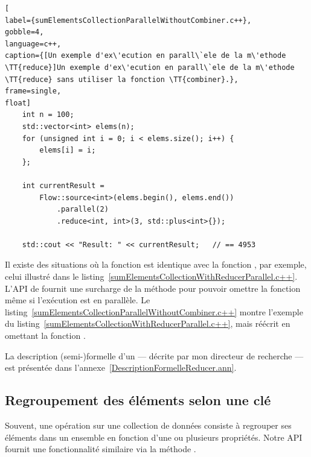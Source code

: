 \begin{lstlisting}[
label={sumElementsCollectionParallelWithoutCombiner.c++},
gobble=4,
language=c++,
caption={[Un exemple d'ex\'ecution en parall\`ele de la m\'ethode \TT{reduce}]Un exemple d'ex\'ecution en parall\`ele de la m\'ethode \TT{reduce} sans utiliser la fonction \TT{combiner}.},
frame=single,
float]
    int n = 100;
    std::vector<int> elems(n);
    for (unsigned int i = 0; i < elems.size(); i++) {
        elems[i] = i;
    };

	int currentResult =
		Flow::source<int>(elems.begin(), elems.end())
            .parallel(2)
            .reduce<int, int>(3, std::plus<int>{}); 
	
	std::cout << "Result: " << currentResult;	// == 4953
\end{lstlisting}



Il existe des situations o\`u la fonction  est identique avec la fonction , par exemple, celui illustr\'e dans le listing~\ref{sumElementsCollectionWithReducerParallel.c++}. L'API de  fournit une surcharge de la m\'ethode  pour pouvoir omettre la fonction  m\^eme si l'ex\'ecution est en parall\`ele. Le listing~\ref{sumElementsCollectionParallelWithoutCombiner.c++} montre l'exemple du listing~\ref{sumElementsCollectionWithReducerParallel.c++}, mais r\'e\'ecrit en omettant la fonction . 






La description (semi-)formelle d'un  --- d\'ecrite par mon directeur de recherche --- est pr\'esent\'ee dans l'annexe~\ref{DescriptionFormelleReducer.ann}.



\subsection{Regroupement des \'el\'ements selon une cl\'e}

Souvent, une op\'eration sur une collection de donn\'ees consiste \`a regrouper ses \'el\'ements dans un ensemble en fonction d'une ou plusieurs propri\'et\'es. Notre {API} fournit une fonctionnalit\'e similaire via la m\'ethode .


